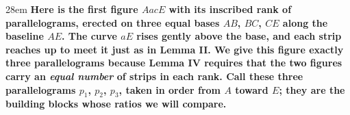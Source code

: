 \documentclass[border=4pt]{standalone}
\begin{document}
\begin{varwidth}{28em}
\large\bfseries
Here is the \textcolor{figaviolet}{first figure $AacE$ with its inscribed rank of parallelograms}, erected on three equal bases $AB$, $BC$, $CE$ along \textcolor{basegreen}{the baseline $AE$}. \textcolor{curveblue}{The curve $aE$} rises gently above the base, and each strip reaches up to meet it just as in Lemma II. We give this figure exactly three parallelograms because Lemma IV requires that the two figures carry an \emph{equal number} of strips in each rank. Call these three parallelograms $p_1$, $p_2$, $p_3$, taken in order from $A$ toward $E$; they are the building blocks whose ratios we will compare.
\end{varwidth}
\end{document}
